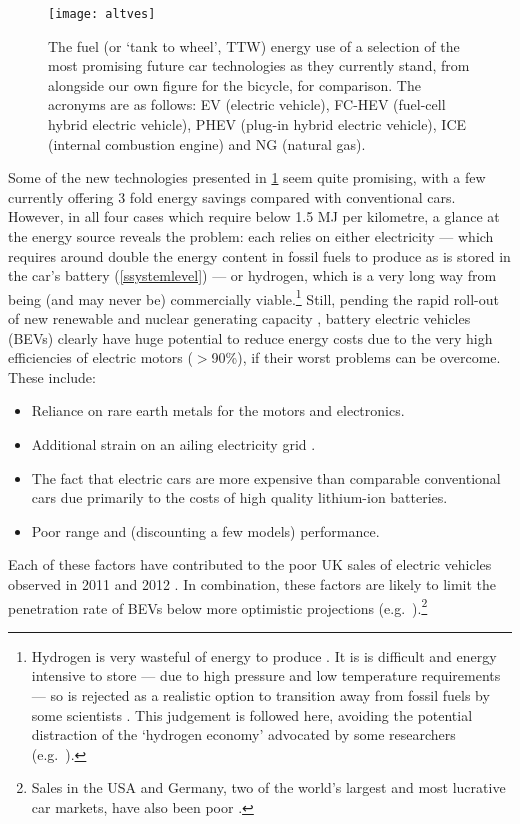 \begin{figure}
 \texttt{[image: altves]}
 \caption[Fuel energy use of future car technologies]
 {The fuel (or `tank to wheel', TTW) energy use of a selection of
 the most promising future car technologies as they currently stand, from
 \citet{Baptista2012} alongside our own figure for the bicycle, for comparison.
 The acronyms are
 as follows: EV (electric vehicle), FC-HEV (fuel-cell hybrid electric vehicle),
 PHEV (plug-in hybrid electric vehicle), ICE (internal combustion engine) and
 NG (natural gas).} \label{faltves}
\end{figure}

Some of the new technologies presented in \cref{faltves} seem quite promising,
with a few currently offering 3 fold energy savings compared with conventional
cars. However, in all four cases which require below 1.5 MJ per kilometre, a
glance at the energy source reveals the problem: each relies on either
electricity --- which requires around double
the energy content in fossil fuels to produce as is stored in the car's
battery (\cref{ssystemlevel})
--- or hydrogen, which is a very long way from being (and may never be)
commercially viable.\footnote{Hydrogen
is very wasteful of energy to produce \citep{Smil2008}. It is
is difficult and energy intensive to store --- due to high pressure and low temperature
requirements --- so is rejected as a realistic option to transition away from
fossil fuels by some scientists \citep{MacKay2009, kreith2004fallacies}.
This judgement is followed here, avoiding the potential distraction of the
`hydrogen economy' advocated by some researchers (e.g.~\citealp{Kleijn2010}).
}
Still, pending the rapid roll-out of new renewable and nuclear generating
capacity \citep{dyke2010impact},
battery electric vehicles (BEVs) clearly have huge
potential to reduce energy costs due to the very high efficiencies of
electric motors ($>$90\%), if their worst problems can be overcome.
These include:
\begin{itemize}
 \item Reliance on rare earth metals for the motors and electronics.
 \item Additional strain on an ailing electricity grid \citep{dyke2010impact,
 webster1999can}.
 \item The fact that electric cars are
more expensive than comparable conventional cars due primarily to the costs of
high quality lithium-ion batteries.
\item Poor range and (discounting a few models) performance.
\end{itemize}
Each of these factors have contributed to
the poor UK sales of electric vehicles observed in 2011
\citep{AdamVaughan2011} and 2012 \citep{DavidCornis, Massey2013elecmail}.
In combination, these factors are likely to limit the penetration rate of BEVs below
more optimistic projections (e.g.~\citealp{Shepherd2012}).\footnote{Sales
in the USA and Germany, two of the world's largest and most lucrative car
markets, have also been poor \citep{Hepker, Mihalascu}.}

